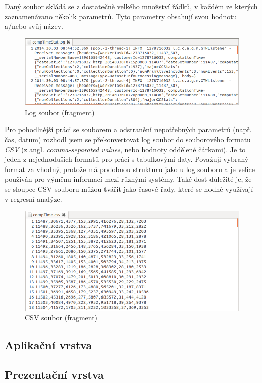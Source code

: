 \documentclass[a4paper,12pt,twoside]{scrreprt}
\begin{document}
Daný soubor skládá se z dostatečně velkého množství řádků, v každém ze kterých zaznamenávano několik parametrů. Tyto parametry obsahují svou hodnotu a/nebo svůj název. 

\begin{figure}[h]
  \centering
  \includegraphics[width=15cm]{pictures/log.png}
  \caption{Log soubor (fragment)}
  \label{fig:log}
\end{figure}

Pro pohodlnější práci se souborem a odstranění nepotřebných parametrů (např. čas, datum) rozhodl jsem se překonvertovat log soubor do souborového formatu \textit{CSV} 	(z angl. \textit{comma-separated values}, nebo hodnoty oddělené čárkami). Je to jeden z nejednoduších formatů pro práci s tabulkovými daty. Považuji vybraný format za vhodný, protože má podobnou strukturu jako u log souboru a je velice používán pro výměnu informací mezi různými systémy. Také dost důležité je, že se sloupce CSV souboru můžou tvářit jako časové řady, které se hodně využívají v regresní analýze.   

\begin{figure}[h]
  \centering
  \includegraphics[width=15cm]{pictures/csv.png}
  \caption{CSV soubor (fragment)}
  \label{fig:csv}
\end{figure}

\subsection{Aplikační vrstva}
\subsection{Prezentační vrstva}
\end{document}
